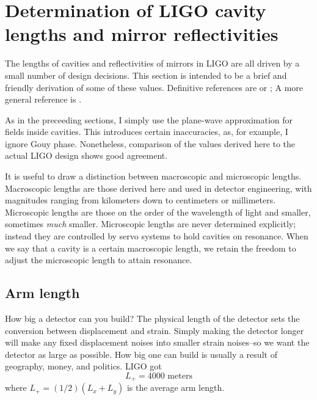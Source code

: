 \pagebreak

\section{Determination of LIGO cavity lengths and mirror reflectivities}

The lengths of cavities and reflectivities of mirrors in LIGO are all
driven by a small number of design decisions.  This section is
intended to be a brief and friendly derivation of some of these
values.  Definitive references are \cite{LigoFreqResponse97} or
\cite{Fritschel2001Readout}; A more general reference is
\cite{S5InstrumentPaper}.

As in the preceeding sections, I simply use the plane-wave
approximation for fields inside cavities. This introduces certain
inaccuracies, as, for example, I ignore Gouy phase. Nonetheless,
comparison of the values derived here to the actual LIGO design shows good agreement.

It is useful to draw a distinction between macroscopic and microscopic
lengths. Macroscopic lengths are those derived here and
used in detector engineering, with magnitudes ranging from kilometers
down to centimeters or millimeters. Microscopic lengths are those
on the order of the wavelength of light and smaller, sometimes \emph{much}
smaller. Microscopic lengths are never determined explicitly; instead
they are controlled by servo systems to hold cavities on resonance.
When we say that a cavity is a certain macroscopic length, we retain
the freedom to adjust the microscopic length to attain resonance.

\subsection*{Arm length}

How big a detector can you build? The physical length of the detector
sets the conversion between displacement and strain. Simply making the
detector longer will make any fixed displacement noises into smaller
strain noises--so we want the detector as large as possible. How big
one can build is usually a result of geography, money, and politics.
LIGO got
%
\begin{equation}
\boxed{{L_{+}=4000\text{{\ meters}}}}
\end{equation}
where $L_+=(1/2)(L_x + L_y)$ is the average arm length.

